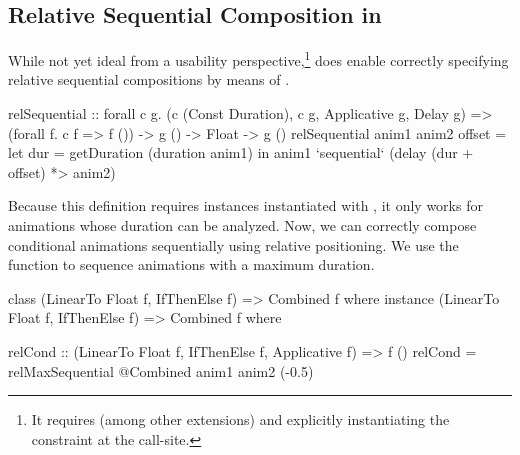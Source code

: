 \subsection{Relative Sequential Composition in \dsl{}}

While not yet ideal from a usability perspective,\footnote{It
requires
 (among other extensions) and explicitly instantiating the
constraint  at the call-site.
}
 \dsl{} does enable correctly
specifying relative sequential compositions by means of .
\begin{spec}
relSequential :: forall c g.
  (c (Const Duration), c g, Applicative g, Delay g) =>
  (forall f. c f => f ()) -> g () -> Float -> g ()
relSequential anim1 anim2 offset = let
  dur = getDuration (duration anim1)
  in anim1 `sequential` (delay (dur + offset) *> anim2)
\end{spec}

Because this definition requires instances instantiated with ,
it only works for animations whose duration can be analyzed. 
Now, we can correctly compose conditional animations sequentially using
relative positioning. We use the  function to sequence
animations with a maximum duration.

\begin{spec}
class (LinearTo Float f, IfThenElse f) => Combined f where
instance (LinearTo Float f, IfThenElse f) => Combined f where

relCond :: (LinearTo Float f, IfThenElse f, Applicative f) => f ()
relCond = relMaxSequential @Combined anim1 anim2 (-0.5)
\end{spec}


